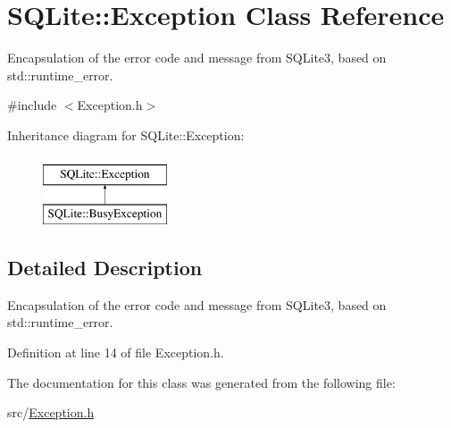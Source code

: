 \hypertarget{a00006}{\section{S\-Q\-Lite\-:\-:Exception Class Reference}
\label{a00006}
}


Encapsulation of the error code and message from S\-Q\-Lite3, based on std\-::runtime\-\_\-error.  




{\ttfamily \#include $<$Exception.\-h$>$}

Inheritance diagram for S\-Q\-Lite\-:\-:Exception\-:\begin{figure}[H]
\begin{center}
\leavevmode
\includegraphics[height=2.000000cm]{a00006}
\end{center}
\end{figure}


\subsection{Detailed Description}
Encapsulation of the error code and message from S\-Q\-Lite3, based on std\-::runtime\-\_\-error. 



Definition at line 14 of file Exception.\-h.



The documentation for this class was generated from the following file\-:\begin{DoxyCompactItemize}
\item 
src/\hyperlink{a00024}{Exception.\-h}\end{DoxyCompactItemize}
